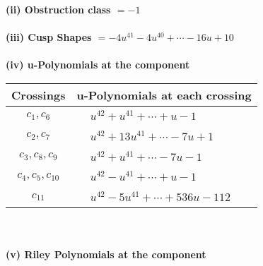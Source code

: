 \documentclass[1p]{elsarticle_modified}
\theoremstyle{definition}
\begin{document}
\flushleft \textbf{(ii) Obstruction class $= -1$}\\~\\
\flushleft \textbf{(iii) Cusp Shapes $= -4 u^{41}-4 u^{40}+\cdots-16 u+10$}\\~\\
\newpage\renewcommand{\arraystretch}{1}
\flushleft \textbf{(iv) u-Polynomials at the component}\newline \\
\begin{tabular}{m{50pt}|m{274pt}}
Crossings & \hspace{64pt}u-Polynomials at each crossing \\
\hline $$\begin{aligned}c_{1},c_{6}\end{aligned}$$&$\begin{aligned}
&u^{42}+u^{41}+\cdots+u-1
\end{aligned}$\\
\hline $$\begin{aligned}c_{2},c_{7}\end{aligned}$$&$\begin{aligned}
&u^{42}+13 u^{41}+\cdots-7 u+1
\end{aligned}$\\
\hline $$\begin{aligned}c_{3},c_{8},c_{9}\end{aligned}$$&$\begin{aligned}
&u^{42}+u^{41}+\cdots-7 u-1
\end{aligned}$\\
\hline $$\begin{aligned}c_{4},c_{5},c_{10}\end{aligned}$$&$\begin{aligned}
&u^{42}- u^{41}+\cdots+u-1
\end{aligned}$\\
\hline $$\begin{aligned}c_{11}\end{aligned}$$&$\begin{aligned}
&u^{42}-5 u^{41}+\cdots+536 u-112
\end{aligned}$\\
\hline
\end{tabular}\\~\\
\newpage\renewcommand{\arraystretch}{1}
\flushleft \textbf{(v) Riley Polynomials at the component}\newline \\
\end{document}
